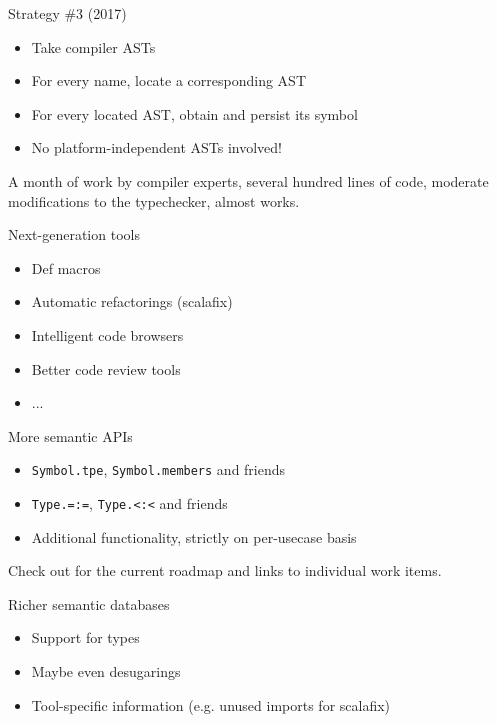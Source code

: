 \documentclass[svgnames,dvipsnames,hyperref={bookmarks=false},usepdftitle=false]{beamer}
\begin{document}
\begin{frame}{Strategy \#3 (2017)}
\begin{itemize}
\item Take compiler ASTs
\item For every name, locate a corresponding AST
\item For every located AST, obtain and persist its symbol
\item No platform-independent ASTs involved!
\end{itemize}
\vskip15pt
A month of work by compiler experts,
several hundred lines of code,
moderate modifications to the typechecker,
almost works.
\end{frame}


\begin{frame}{Next-generation tools}
\begin{itemize}
\item Def macros
\item Automatic refactorings (scalafix)
\item Intelligent code browsers
\item Better code review tools
\item ...
\end{itemize}
\end{frame}

\begin{frame}{More semantic APIs}
\begin{itemize}
\item \texttt{Symbol.tpe}, \texttt{Symbol.members} and friends
\item \texttt{Type.=:=}, \texttt{Type.<:<} and friends
\item Additional functionality, strictly on per-usecase basis
\end{itemize}

\vskip15pt
Check out 
for the current roadmap and links to individual work items.
\end{frame}

\begin{frame}{Richer semantic databases}
\begin{itemize}
\item Support for types
\item Maybe even desugarings
\item Tool-specific information (e.g. unused imports for scalafix)
\end{itemize}
\end{frame}
\end{document}
